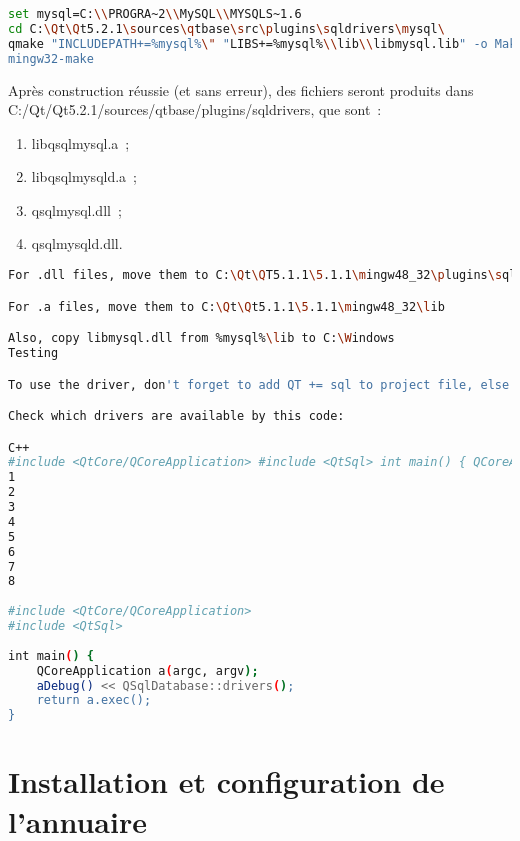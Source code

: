 
\begin{lstlisting}[language=Bash, escapechar=$]
set mysql=C:\\PROGRA~2\\MySQL\\MYSQLS~1.6
cd C:\Qt\Qt5.2.1\sources\qtbase\src\plugins\sqldrivers\mysql\
qmake "INCLUDEPATH+=%mysql%\" "LIBS+=%mysql%\\lib\\libmysql.lib" -o Makefile mysql.pro
mingw32-make
\end{lstlisting}
Après construction réussie (et sans erreur), des fichiers seront produits dans \\ C:/Qt/Qt5.2.1/sources/qtbase/plugins/sqldrivers, que sont~:
\begin{enumerate}
	\item libqsqlmysql.a~;
	\item libqsqlmysqld.a~;
	\item qsqlmysql.dll~;
	\item qsqlmysqld.dll.
\end{enumerate}
\begin{lstlisting}[language=Bash, escapechar=$]
For .dll files, move them to C:\Qt\QT5.1.1\5.1.1\mingw48_32\plugins\sqldrivers.

For .a files, move them to C:\Qt\Qt5.1.1\5.1.1\mingw48_32\lib

Also, copy libmysql.dll from %mysql%\lib to C:\Windows
Testing

To use the driver, don't forget to add QT += sql to project file, else it don't work.

Check which drivers are available by this code:

C++
#include <QtCore/QCoreApplication> #include <QtSql> int main() { QCoreApplication a(argc, argv); aDebug() << QSqlDatabase::drivers(); return a.exec(); }
1
2
3
4
5
6
7
8
	
#include <QtCore/QCoreApplication>
#include <QtSql>
 
int main() {
    QCoreApplication a(argc, argv);
    aDebug() << QSqlDatabase::drivers();
    return a.exec();
}

\end{lstlisting}

\section{Installation et configuration de l'annuaire }



